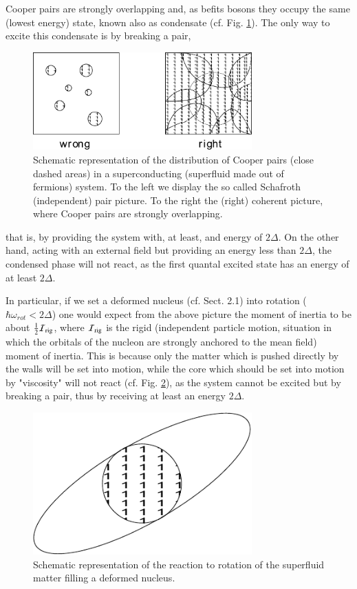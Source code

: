 \documentclass[a4paper,14pt]{book}
\begin{document}
Cooper pairs are strongly overlapping and, as befits bosons they occupy the same (lowest energy) state, known also as condensate (cf. Fig. \ref{fig:8.4}). The only way to excite this condensate is by breaking a pair,
\begin{figure}[h!]
\centerline{
\includegraphics*[width=0.75\textwidth]{figs_C7S/fig_8_4}
}
\caption{Schematic representation of the distribution of Cooper pairs (close dashed areas) in a superconducting (superfluid made out of fermions) system. To the left we display the so called Schafroth (independent) pair picture. To the right the (right) coherent picture, where Cooper pairs are strongly overlapping.}
\label{fig:8.4}
\end{figure}
that is, by providing the system with, at least, and energy of $2 \Delta$. On the other hand, acting with an external field but providing an energy less than $2 \Delta$, the condensed phase will not react, as the first quantal excited state has an energy of at least $2 \Delta$.

In particular, if we set a deformed nucleus (cf. Sect. 2.1) into rotation ($\hbar \omega_{rot} < 2 \Delta$) one would expect from the above picture the moment of inertia to be about $\frac{1}{2} {\cal I}_{{\rm rig}}$, where ${\cal I}_{{\rm rig}}$ is the rigid (independent particle motion, situation in which the orbitals of the nucleon are strongly anchored to the mean field) moment of inertia. This is because only the matter which is pushed directly by the walls will be set into motion, while the core which should be set into motion by "viscosity" will not react (cf. Fig. \ref{fig:8.5}), as the system cannot be excited but by breaking a pair, thus by receiving at least an energy $2 \Delta$.

\begin{figure}[h!]
\centerline{
\includegraphics*[width=0.75\textwidth]{figs_C7S/fig_8_5}
}
\caption{Schematic representation of the reaction to rotation of the superfluid matter filling a deformed nucleus.}
\label{fig:8.5}
\end{figure}
\end{document}
